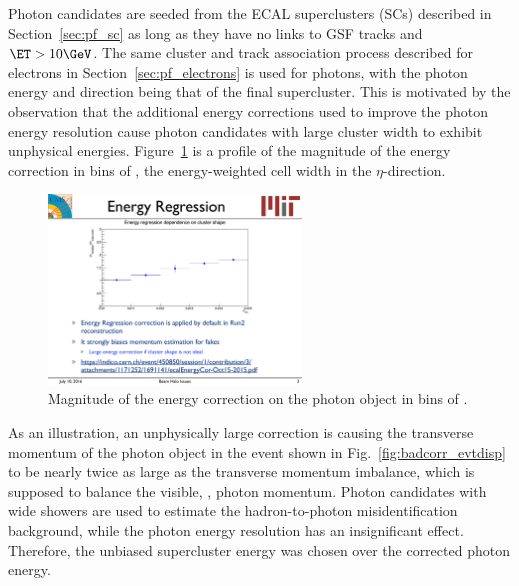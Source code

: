 Photon candidates are seeded from the ECAL superclusters (SCs) described in Section~\ref{sec:pf_sc} as long as they have no links to GSF tracks and $\ET > 10\GeV$. 
The same cluster and track association process described for electrons in Section~\ref{sec:pf_electrons} is used for photons, with the photon energy and direction being that of the final supercluster.
This is motivated by the observation that the additional energy corrections used to improve the photon energy resolution cause photon candidates with large cluster width to exhibit unphysical energies. 
Figure~\ref{fig:corr_vs_sieie} is a profile of the magnitude of the energy correction in bins of \sieie, the energy-weighted cell width in the $\eta$-direction.

\begin{figure}[htbp]
  \begin{center}
    \includegraphics[width=0.6\textwidth]{Reconstruction/Figures/corr_vs_sieie.pdf}
    \caption{
      Magnitude of the energy correction on the photon object in bins of \sieie.
    }
    \label{fig:corr_vs_sieie}
  \end{center}
\end{figure}

As an illustration, an unphysically large correction is causing the transverse momentum of the photon object in the event shown in Fig.~\ref{fig:badcorr_evtdisp} to be nearly twice as large as the transverse momentum imbalance, which is supposed to balance the visible, \ie, photon momentum. 
Photon candidates with wide showers are used to estimate the hadron-to-photon misidentification background, while the photon energy resolution has an insignificant effect. 
Therefore, the unbiased supercluster energy was chosen over the corrected photon energy.

